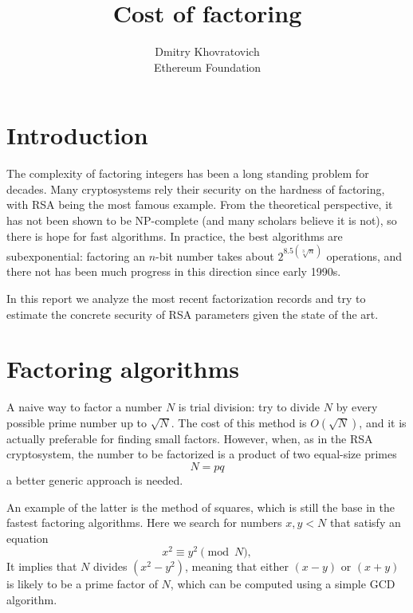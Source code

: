 \documentclass[a4paper]{article}
\title{Cost of factoring}
\author{Dmitry Khovratovich\\Ethereum Foundation}
\begin{document}
\maketitle

\section{Introduction}

The complexity of factoring integers has been a long standing problem for decades. Many cryptosystems rely their security on the hardness of factoring, with RSA being the most famous example. From the theoretical perspective, it has not been shown to be NP-complete (and many scholars believe it is not), so there is hope for fast algorithms. In practice, the best algorithms are subexponential: factoring an $n$-bit number takes about $2^{8.5(\sqrt[3]{n})}$ operations, and there not has been much progress in this direction since early 1990s.

In this report we analyze the most recent factorization records and try to estimate the concrete security of RSA parameters given the state of the art.


\section{Factoring algorithms}

A naive way to factor a number $N$ is trial division: try to divide $N$ by every possible prime number up to $\sqrt{N}$. The cost of this method is $O(\sqrt{N})$, and it is actually preferable for finding small factors. However, when, as in the RSA cryptosystem, the number to be factorized is a product of two equal-size primes
$$
N = pq
$$
a better generic approach is needed.

An example of the latter is the method of squares, which is still the base in the fastest factoring algorithms. Here we search for numbers $x,y <N$ that satisfy an equation
\begin{equation}\label{eq:square}
x^2 \equiv y^2 \pmod{N},
\end{equation}
It implies that $N$ divides $(x^2-y^2)$, meaning that  either $(x-y)$ or $(x+y)$ is likely to be a prime factor of $N$, which can be computed using a simple GCD algorithm. 
\end{document}
